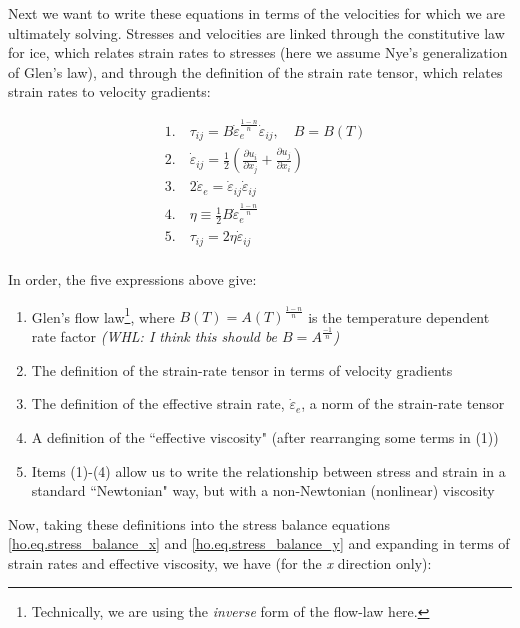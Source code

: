 Next we want to write these equations in terms of the velocities for which we are ultimately solving. Stresses and velocities are linked through the 
constitutive law for ice, which relates strain rates to stresses (here we assume Nye's generalization of Glen's law), and through the 
definition of the strain rate tensor, which relates strain rates to velocity gradients:

\begin{equation}
  \begin{split}
    & 1.\quad \tau _{ij}=B\dot{\varepsilon }_{e}^{\frac{1-n}{n}}\dot{\varepsilon }_{ij},\quad B=B(T) \\ 
    & 2.\quad \dot{\varepsilon }_{ij}=\frac{1}{2}\left( \frac{\partial u_{i}}{\partial x_{j}}+\frac{\partial u_{j}}{\partial x_{i}} \right) \\ 
    & 3.\quad 2\dot{\varepsilon }_{e}=\dot{\varepsilon }_{ij}\dot{\varepsilon }_{ij} \\ 
    & 4.\quad \eta \equiv \frac{1}{2}B\dot{\varepsilon }_{e}^{\frac{1-n}{n}} \\ 
    & 5.\quad \tau _{ij}=2\eta \dot{\varepsilon }_{ij} \\ 
  \end{split}
\end{equation}

\noindent
In order, the five expressions above give: 

\begin{enumerate}
\item  Glen's flow law\footnote{Technically, we are using the \textit{inverse} form of the flow-law here.}, where 
$B(T) = A(T)^{\frac{1-n}{n}}$ is the temperature dependent rate factor \textit{(WHL: I think this should be $B = A^{\frac{-1}{n}}$)} 
\item  The definition of the strain-rate tensor in terms of velocity gradients
\item  The definition of the effective strain rate, $\dot{\varepsilon }_{e}$, a norm of the strain-rate tensor
\item  A definition of the ``effective viscosity" (after rearranging some terms in (1))
\item  Items (1)-(4) allow us to write the relationship between stress and strain in a standard ``Newtonian" way, but with a non-Newtonian (nonlinear) viscosity
\end{enumerate}

\noindent
Now, taking these definitions into the stress balance equations \eqref{ho.eq.stress_balance_x} and \eqref{ho.eq.stress_balance_y} 
and expanding in terms of strain rates and effective viscosity, we have (for the \textit{x} direction only):


